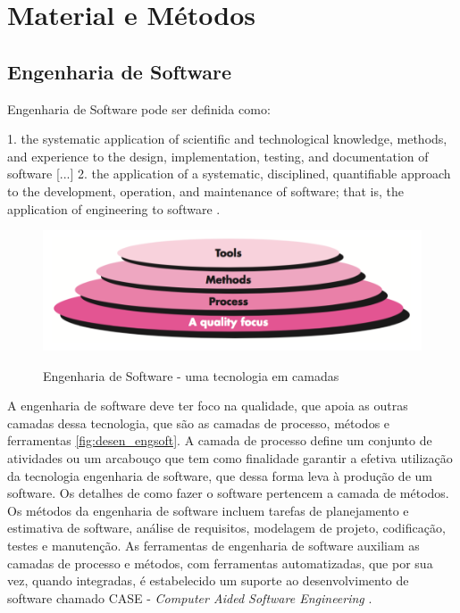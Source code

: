\chapter{Material e Métodos}


\section{Engenharia de Software}

Engenharia de Software pode ser definida como:
\begin{citacao}[english]
1. the systematic application of scientific and technological knowledge, methods, and experience to the design,
implementation, testing, and documentation of software [...]  2. the application
of a systematic, disciplined, quantifiable approach to the development, operation,
and maintenance of software; that is, the application of engineering to software \cite{IEEE2010}.
\end{citacao}

\begin{figure}[!b]
  \centering
  \caption{Engenharia de Software - uma tecnologia em camadas}
  \includegraphics[scale=0.33]{imagens/desenv_engsoft2}
  \label{fig:desen_engsoft}
\end{figure}

A engenharia de software deve ter foco na qualidade, que apoia as outras camadas
dessa tecnologia, que são as camadas de processo, métodos e ferramentas \autoref{fig:desen_engsoft}.
A camada de processo define um conjunto de atividades ou um arcabouço que tem
como finalidade garantir a efetiva utilização da tecnologia engenharia de software, que dessa forma
leva à produção de um software. Os detalhes de como fazer o software pertencem
a camada de métodos. Os métodos da engenharia de software incluem tarefas de planejamento
e estimativa de software, análise de requisitos, modelagem de projeto, codificação,
testes e manutenção. As ferramentas de engenharia de software auxiliam as camadas de
processo e métodos, com ferramentas automatizadas, que por sua vez, quando integradas,
é estabelecido um suporte ao desenvolvimento de software chamado CASE -
\textit{Computer Aided Software Engineering} \cite{Pressman2009, Sommerville2006}.

